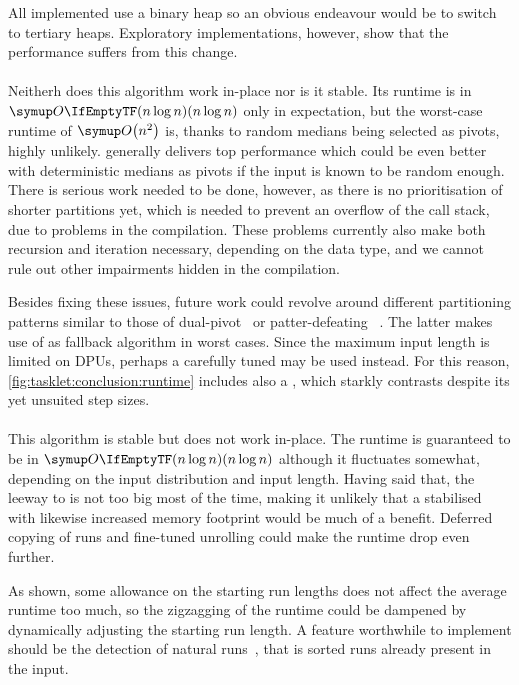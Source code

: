 All implemented \HS*{} use a binary heap so an obvious endeavour would be to switch to tertiary heaps.
Exploratory implementations, however, show that the performance suffers from this change.


\paragraph{\QS{}}
Neitherh does this algorithm work in-place nor is it stable.
Its runtime is in \(\bigoh{n \log n}\) only in expectation, but the worst-case runtime of \(\bigoh*{n^2}\) is, thanks to random medians being selected as pivots, highly unlikely.
\QS{} generally delivers top performance which could be even better with deterministic medians as pivots if the input is known to be random enough.
There is serious work needed to be done, however, as there is no prioritisation of shorter partitions yet, which is needed to prevent an overflow of the call stack, due to problems in the compilation.
These problems currently also make both recursion and iteration necessary, depending on the data type, and we cannot rule out other impairments hidden in the compilation.

Besides fixing these issues, future work could revolve around different partitioning patterns similar to those of dual-pivot~\cite{wild2012averagecase} or patter-defeating \QS{}~\cite{peters2021patterndefeatingquicksort}.
The latter makes use of \HS{} as fallback algorithm in worst cases.
Since the maximum input length is limited on DPUs, perhaps a carefully tuned \ShS{} may be used instead.
For this reason, \cref{fig:tasklet:conclusion:runtime} includes also a \ShS{}, which starkly contrasts \HS{} despite its yet unsuited step sizes.


\paragraph{\MS{}}
This algorithm is stable but does not work in-place.
The runtime is guaranteed to be in \(\bigoh{n \log n}\) although it fluctuates somewhat, depending on the input distribution and input length.
Having said that, the leeway to \QS{} is not too big most of the time, making it unlikely that a stabilised \QS{} with likewise increased memory footprint would be much of a benefit.
Deferred copying of runs and fine-tuned unrolling could make the runtime drop even further.

As shown, some allowance on the starting run lengths does not affect the average runtime too much, so the zigzagging of the runtime could be dampened by dynamically adjusting the starting run length.
A feature worthwhile to implement should be the detection of natural runs~\cite[Chapter~2.3.2]{wirth1975algorithmen}, that is sorted runs already present in the input.

